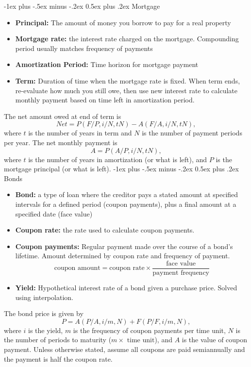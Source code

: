 \documentclass[11pt,landscape]{article}
\makeatletter
\renewcommand{\section}{\@startsection{section}{1}{0mm}%
                                {-1ex plus -.5ex minus -.2ex}%
                                {0.5ex plus .2ex}%
                                {\normalfont\large\bfseries}}
\makeatother
\begin{document}
\begin{multicols*}{3}
\section{Mortgage}
\begin{itemize}
    \item \textbf{Principal:} The amount of money you borrow to pay for a real property
    \item \textbf{Mortgage rate:} the interest rate charged on the mortgage. Compounding period usually matches frequency of payments
    \item \textbf{Amortization Period:} Time horizon for mortgage payment
    \item \textbf{Term:} Duration of time when the mortgage rate is fixed. When term ends, re-evaluate how much you still owe, then use new interest rate to calculate monthly payment based on time left in amortization period.
\end{itemize}
The net amount owed at end of term is 
\begin{equation*}
    Net = P\left(F/P, i/N, tN\right) - A\left(F/A, i/N, tN\right),
\end{equation*}
where $t$ is the number of years in term and $N$ is the number of payment periods per year. The net monthly payment is 
\begin{equation*}
    A = P\left(A/P, i/N, tN\right),
\end{equation*}
where $t$ is the number of years in amortization (or what is left), and $P$ is the mortgage principal (or what is left).
\section{Bonds}
\begin{itemize}
    \item \textbf{Bond:} a type of loan where the creditor pays a stated amount at specified intervals for a defined period (coupon payments), plus a final amount at a specified date (face value)
    \item \textbf{Coupon rate:} the rate used to calculate coupon payments.
    \item \textbf{Coupon payments:} Regular payment made over the course of a bond's lifetime. Amount determined by coupon rate and frequency of payment.
    \begin{equation*}
        \text{coupon amount} = \text{coupon rate} \times \frac{\text{face value}}{\text{payment frequency}}
    \end{equation*}
    \item \textbf{Yield:} Hypothetical interest rate of a bond given a purchase price. Solved using interpolation.
\end{itemize}
The bond price is given by 
\begin{equation*}
    P = A\left(P/A, i/m, N\right) + F\left(P/F, i/m, N\right),
\end{equation*}
where $i$ is the yield, $m$ is the frequency of coupon payments per time unit, $N$ is the number of periods to maturity ($m\times \text{ time unit}$), and $A$ is the value of coupon payment. Unless otherwise stated, assume all coupons are paid semiannually and the payment is half the coupon rate.

\end{multicols*}
\end{document}
